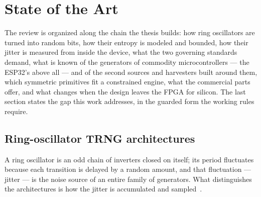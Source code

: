 \chapter{State of the Art}
\label{ch:ch2_soa}


The review is organized along the chain the thesis builds: how ring
oscillators are turned into random bits, how their entropy is modeled and
bounded, how their jitter is measured from inside the device, what the two
governing standards demand, what is known of the generators of commodity
microcontrollers --- the ESP32's above all --- and of the second sources
and harvesters built around them, which symmetric primitives fit a constrained
engine, what the commercial parts offer, and what changes when the design
leaves the FPGA for silicon. The last section states the gap this work
addresses, in the guarded form the working rules require.

\section{Ring-oscillator TRNG architectures}
\label{sec:soa_archs}

A ring oscillator is an odd chain of inverters closed on itself; its
period fluctuates because each transition is delayed by a random amount,
and that fluctuation --- jitter --- is the noise source of an entire family
of generators. What distinguishes the architectures is how the jitter is
accumulated and sampled~\cite{petura_2016_survey, lubicz_2024_recommendations}.

